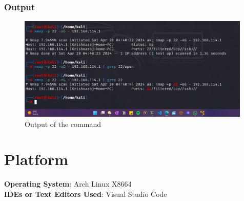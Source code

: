 \documentclass[11pt]{article}
\begin{document}
\subsubsection*{Output}
\begin{figure}[H]
    \centering
    \includegraphics[width=0.99\textwidth]{Screenshot 2024-04-20 141054.png}
    \caption{Output of the command}
    \label{fig:1}
\end{figure}


\section{Platform}
\textbf{Operating System}: Arch Linux X8664 \\
\textbf{IDEs or Text Editors Used}: Visual Studio Code\\

% 
\end{document}
